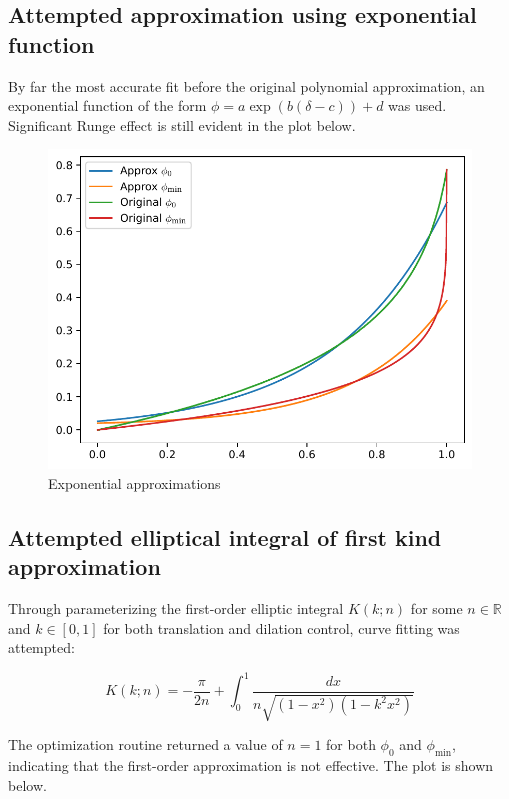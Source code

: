 \subsection{Attempted approximation using exponential function}

By far the most accurate fit before the original polynomial approximation, an exponential function of the form $\phi=a\exp(b(\delta-c))+d$ was used.
Significant Runge effect is still evident in the plot below.

\begin{figure}[H]
    \centering
    \includegraphics[scale=0.75]{plots/exponential-approx.pdf}
    \caption{Exponential approximations}
\end{figure}

\subsection{Attempted elliptical integral of first kind approximation}

Through parameterizing the first-order elliptic integral $K(k;n)$ for some $n\in \mathbb{R}$ and $k\in[0,1]$ for both translation and dilation control, curve fitting was attempted:

\begin{equation}
    K(k;n)=-\frac{\pi}{2n}+\int_0^1 \frac{dx}{n\sqrt{(1-x^2)(1-k^2x^2)}}
\end{equation}

The optimization routine returned a value of $n=1$ for both $\phi_0$ and $\phi_\mathrm{min}$, indicating that the first-order approximation is not effective. The plot is shown below.

